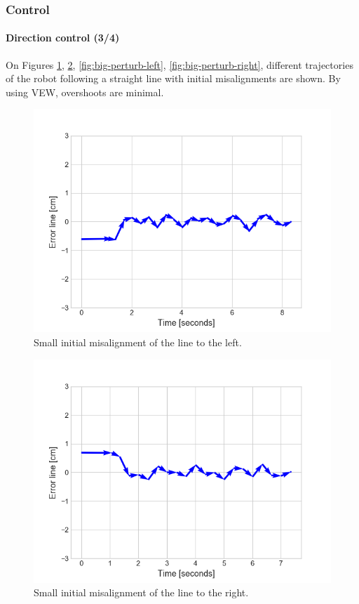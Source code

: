 \documentclass[10pt]{beamer}
\begin{document}
\begin{frame}
\frametitle{Control}
\framesubtitle{Direction control (3/4)}
On Figures \ref{fig:small-perturb-left}, \ref{fig:small-perturb-right}, \ref{fig:big-perturb-left}, \ref{fig:big-perturb-right}, different trajectories of the robot following a straight line with initial misalignments are shown. By using VEW, overshoots are minimal.
\vspace*{-4mm}
\begin{multicols}{2}
\begin{figure}
\centering
\includegraphics[scale=0.4]{figures/small-perturbation-left.png}
\caption{Small initial misalignment of the line to the left.}
\label{fig:small-perturb-left}
\end{figure}
\columnbreak
\begin{figure}
\centering
\includegraphics[scale=0.4]{figures/small-perturbation-right.png}
\caption{Small initial misalignment of the line to the right.}
\label{fig:small-perturb-right}
\end{figure}
\end{multicols}
\end{frame}
\end{document}

